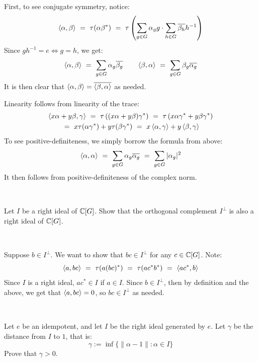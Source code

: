 \begin{pf}
	First, to see conjugate symmetry, notice:
	\begin{equation*}
		\left\langle{\alpha,\beta}\right\rangle
		\ = \ \tau(\alpha\beta^{*})
		\ = \ \tau \left(\sum_{g\in G}\alpha_{g}g \cdot \sum_{h\in G}\overline{\beta_{h}}h^{-1}\right)
	\end{equation*}
	Since $gh^{-1}=e \iff g=h$, we get:
	\begin{equation*}
		\left\langle{\alpha,\beta}\right\rangle
		\ = \ \sum_{g\in G}\alpha_{g}\overline{\beta_{g}} \qquad
		\left\langle{\beta,\alpha}\right\rangle
		\ = \ \sum_{g\in G}\beta_{g}\overline{\alpha_{g}}
	\end{equation*}
	It is then clear that $\left\langle{\alpha,\beta}\right\rangle=\overline{\left\langle{\beta,\alpha}\right\rangle}$ as needed.

	Linearity follows from linearity of the trace:
	\begin{gather*}
		\left\langle{x\alpha+y\beta,\gamma}\right\rangle
		\ = \ \tau\left((x\alpha+y\beta)\gamma^{*}\right)
		\ = \ \tau\left(x\alpha\gamma^{*}+y\beta\gamma^{*}\right) \\
		\ = \ x\tau(\alpha\gamma^{*})+y\tau(\beta\gamma^{*})
		\ = \ x\left\langle{\alpha,\gamma}\right\rangle+y\left\langle{\beta,\gamma}\right\rangle
	\end{gather*}
	To see positive-definiteness, we simply borrow the formula from above:
	\begin{equation*}
		\left\langle{\alpha,\alpha}\right\rangle
		\ = \ \sum_{g\in G}\alpha_{g}\overline{\alpha_{g}}
		\ = \ \sum_{g\in G}|\alpha_{g}|^{2}
	\end{equation*}
	It then follows from positive-definiteness of the complex norm.
\end{pf} \

\begin{exr}
	Let $I$ be a right ideal of $\mathbb{C}[G]$.
	Show that the orthogonal complement $I^\perp$ is also a right ideal of $\mathbb{C}[G]$.
\end{exr} \

\begin{pf}
	Suppose $b\in I^{\perp}$. We want to show that $bc\in I^{\perp}$ for any $c\in\mathbb{C}[G]$.
	Note:
	\begin{equation*}
		\ang{a,bc} \ = \ \tau(a(bc)^{*}) \ = \ \tau(ac^{*}b^{*})
		\ = \ \ang{ac^{*},b}
	\end{equation*}
	Since $I$ is a right ideal, $ac^{*}\in I$ if $a\in I$.
	Since $b\in I^{\perp}$, then by definition and the above, we get that
	$\left\langle{a,bc}\right\rangle=0$, so $bc\in I^{\perp}$ as needed.
\end{pf} \

\begin{exr}
	Let $e$ be an idempotent, and let $I$ be the right ideal generated by $e$.
	Let $\gamma$ be the distance from $I$ to $1$, that is:
	\begin{equation*}
		\gamma := \inf\{\|\alpha-1\|:\alpha \in I\}
	\end{equation*}
	Prove that $\gamma>0$.
\end{exr} \

